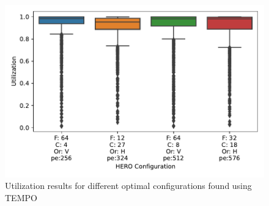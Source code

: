 \begin{figure}[]
    \centering
    \includegraphics[scale=0.7]{Plots/tempo.pdf}
    \caption{Utilization results for different optimal configurations found using TEMPO}
    \label{fig:tempo_results}
\end{figure}
